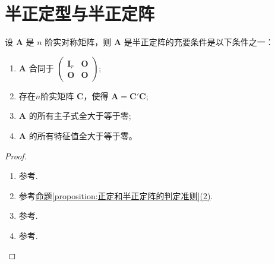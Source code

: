 \documentclass[../../main.tex]{subfiles}%
\begin{document}
\section{半正定型与半正定阵}

\begin{proposition}\label{proposition:半正定阵的判定准则123}
设 \(\boldsymbol{A}\) 是 \(n\) 阶实对称矩阵，则 \(\boldsymbol{A}\) 是半正定阵的充要条件是以下条件之一：
\begin{enumerate}[(1)]
\item \(\boldsymbol{A}\) 合同于 \(\begin{pmatrix}\boldsymbol{I}_r&\boldsymbol{O}\\\boldsymbol{O}&\boldsymbol{O}\end{pmatrix}\);

\item 存在$n$阶实矩阵 \(\boldsymbol{C}\)，使得 \(\boldsymbol{A}=\boldsymbol{C}'\boldsymbol{C}\);

\item \(\boldsymbol{A}\) 的所有主子式全大于等于零;

\item \(\boldsymbol{A}\) 的所有特征值全大于等于零。
\end{enumerate}
\end{proposition}
\begin{proof}
\begin{enumerate}[(1)]
\item 参考.

\item 参考\hyperref[proposition:正定和半正定阵的判定准则]{命题\ref{proposition:正定和半正定阵的判定准则}(2)}.

\item 参考.

\item 参考.
\end{enumerate}

\end{proof}
\end{document}
